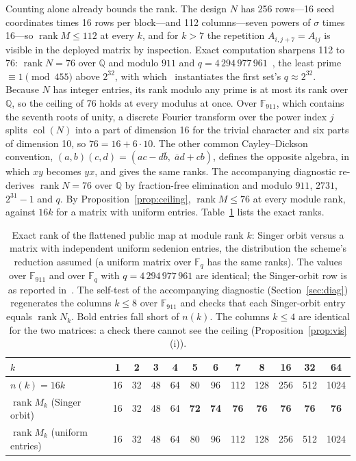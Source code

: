 \documentclass[11pt]{article}
\makeatletter
\theoremstyle{remark}
\newcommand{\F}{\mathbb{F}}
\DeclareMathOperator{\rank}{rank}
\DeclareMathOperator{\col}{col}
\DeclareRobustCommand{\_}{%
  \edef\@tempa{\ttdefault}%
  \ifx\f@family\@tempa\char95 \else\textunderscore\fi\penalty300\relax}
\makeatother
\begin{document}
Counting alone already bounds the rank. The design $N$ has 256 rows---16 seed coordinates times 16 rows per block---and
112 columns---seven powers of $\sigma$ times 16---so $\rank M\le112$ at every $k$, and for $k>7$ the repetition
$A_{i,j+7}=A_{ij}$ is visible in the deployed matrix by inspection. Exact computation sharpens 112 to 76: $\rank N=76$
over $\mathbb{Q}$ and modulo $911$ and $q=4\,294\,977\,961$~\cite{GifNote}, the least prime $\equiv1\pmod{455}$ above
$2^{32}$, with which~\cite{GifNote} instantiates the first set's $q\approx2^{32}$. Because $N$ has integer entries, its rank
modulo any prime is at most its rank over $\mathbb{Q}$, so the ceiling of 76 holds at every modulus at once. Over
$\F_{911}$, which contains the seventh roots of unity, a discrete Fourier transform over the power index $j$ splits
$\col(N)$ into a part of dimension 16 for the trivial character and six parts of dimension 10, so $76=16+6\cdot10$.
The other common Cayley--Dickson convention, $(a,b)(c,d)=(ac-d\bar b,\;\bar a d+cb)$, defines the opposite algebra, in
which $xy$ becomes $yx$, and gives the same ranks. The accompanying diagnostic re-derives $\rank N=76$ over $\mathbb{Q}$ by fraction-free elimination
and modulo $911$, $2731$, $2^{31}-1$ and $q$. By Proposition~\ref{prop:ceiling}, $\rank M\le76$ at every module rank,
against $16k$ for a matrix with uniform entries. Table~\ref{tab:rank} lists the exact ranks.

\begin{table}[h]\centering\small
\begin{tabular}{lccccccccccc}\toprule
$k$ & 1&2&3&4&5&6&7&8&16&32&64\\\midrule
$n(k)=16k$ & 16&32&48&64&80&96&112&128&256&512&1024\\
$\rank M_k$ (Singer orbit) & 16&32&48&64&\textbf{72}&\textbf{74}&\textbf{76}&\textbf{76}&\textbf{76}&\textbf{76}&\textbf{76}\\
$\rank M_k$ (uniform entries) & 16&32&48&64&80&96&112&128&256&512&1024\\\bottomrule
\end{tabular}
\caption{Exact rank of the flattened public map at module rank $k$: Singer orbit versus a matrix with independent
uniform sedenion entries, the distribution the scheme's reduction assumed (a uniform matrix over $\F_q$ has the same
ranks). The values over $\F_{911}$ and over $\F_q$ with $q=4\,294\,977\,961$ are identical; the Singer-orbit row is as
reported in~\cite{GifNote}. The self-test of the accompanying diagnostic (Section~\ref{sec:diag}) regenerates the columns
$k\le8$ over $\F_{911}$ and checks that each Singer-orbit entry equals $\rank N_k$. Bold entries fall short of $n(k)$.
The columns $k\le4$ are identical for the two matrices: a check there cannot see the ceiling
(Proposition~\ref{prop:vis}(i)).}\label{tab:rank}
\end{table}
\end{document}
